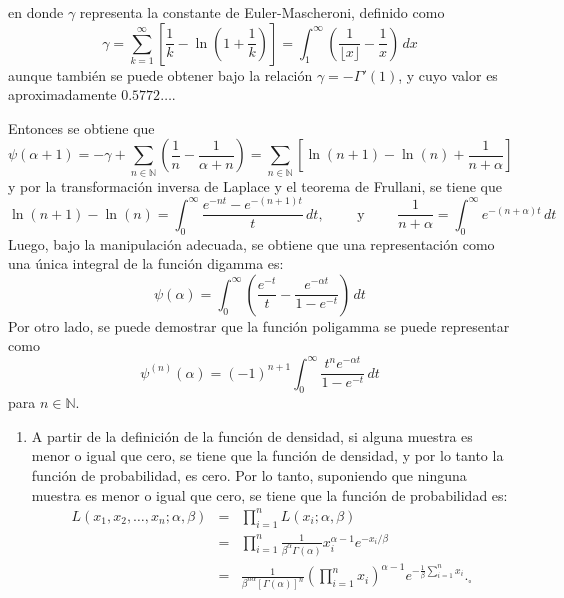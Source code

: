 \begin{solucion}
\begin{equation*}
 \end{equation*}
 en donde $\gamma$ representa la constante de Euler-Mascheroni, definido como
 \begin{equation*}
  \gamma = \sum_{k=1}^{\infty} \left[  \frac{1}{k} - \ln\left( 1 + \frac{1}{k} \right) \right] = \int_{1}^{\infty} \left( \frac{1}{\lfloor x \rfloor} - \frac{1}{x} \right) \, dx
 \end{equation*}
 aunque tambi\'en se puede obtener bajo la relaci\'on $\gamma = -\Gamma'(1)$, y cuyo valor es aproximadamente $0.5772\ldots$.
 \par
 Entonces se obtiene que
 \begin{equation*}
  \psi(\alpha + 1) = - \gamma + \sum_{n\in\mathbb{N}} \left( \frac{1}{n} - \frac{1}{\alpha + n} \right) = \sum_{n\in\mathbb{N}} \left[ \ln(n+1) - \ln(n) + \frac{1}{n+\alpha} \right]
 \end{equation*}
 y por la transformaci\'on inversa de Laplace y el teorema de Frullani, se tiene que
 \begin{equation*}
  \ln(n+1) - \ln(n) = \int_{0}^{\infty} \frac{e^{-nt} - e^{-(n+1)t}}{t} \, dt, \qquad \text{ y } \qquad \frac{1}{n + \alpha} = \int_{0}^{\infty} e^{-(n+\alpha)t} \, dt
 \end{equation*}
 Luego, bajo la manipulaci\'on adecuada, se obtiene que una representaci\'on como una \'unica integral de la funci\'on digamma es:
 \begin{equation*}
  \psi(\alpha) = \int_{0}^{\infty} \left( \frac{e^{-t}}{t} - \frac{e^{-\alpha t}}{1 - e^{-t}} \right) \, dt
 \end{equation*}
 Por otro lado, se puede demostrar que la funci\'on poligamma se puede representar como
 \begin{equation*}
  \psi^{(n)} (\alpha) = (-1)^{n+1} \int_{0}^{\infty} \frac{t^{n}e^{-\alpha t}}{1-e^{-t}} \, dt
 \end{equation*}
 para $n \in \mathbb{N}$.
 \begin{enumerate}
  \item A partir de la definici\'on de la funci\'on de densidad, si alguna muestra es menor o igual que cero, se tiene que la funci\'on de densidad, y por lo tanto la funci\'on de probabilidad, es cero. Por lo tanto, suponiendo que ninguna muestra es menor o igual que cero, se tiene que la funci\'on de probabilidad es:
  \begin{eqnarray*}
   L\left( x_1, x_2, \ldots, x_n; \alpha, \beta \right) & = & \prod_{i=1}^n L\left( x_i; \alpha, \beta \right) \\
   & = & \prod_{i=1}^n \frac{1}{\beta^{\alpha} \Gamma(\alpha)} x_i^{\alpha-1} e^{-x_i/\beta} \\
   & = & \frac{1}{\beta^{n\alpha}\left[ \Gamma(\alpha) \right]^n} \left( \prod_{i=1}^n x_i \right)^{\alpha-1} e^{-\frac{1}{\beta}\sum_{i=1}^n x_i}._{\square}
  \end{eqnarray*}
  

\end{enumerate}
\end{solucion}
